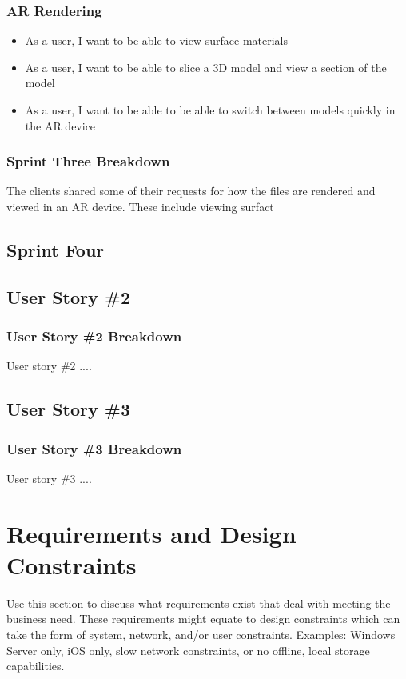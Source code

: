 \subsubsection{AR Rendering}

\begin{itemize}
	\item As a user, I want to be able to view surface materials
	\item As a user, I want to be able to slice a 3D model and view a section of the model
	\item As a user, I want to be able to be able to switch between models quickly in the AR device
\end{itemize}

\subsubsection{Sprint Three Breakdown}

The clients shared some of their requests for how the files are rendered and viewed in an AR device.  These include viewing surfact

\subsection{Sprint Four}


\subsection{User Story \#2} 

\subsubsection{User Story \#2 Breakdown}
User story \#2  .... 

\subsection{User Story \#3} 

\subsubsection{User Story \#3 Breakdown}
User story \#3  .... 



\section{Requirements and Design Constraints}
Use this section to discuss what requirements exist that deal with meeting the 
business need.  These requirements might equate to design constraints which can 
take the form of system, network, and/or user constraints.  Examples:  Windows 
Server only, iOS only, slow network constraints, or no offline, local storage capabilities. 


